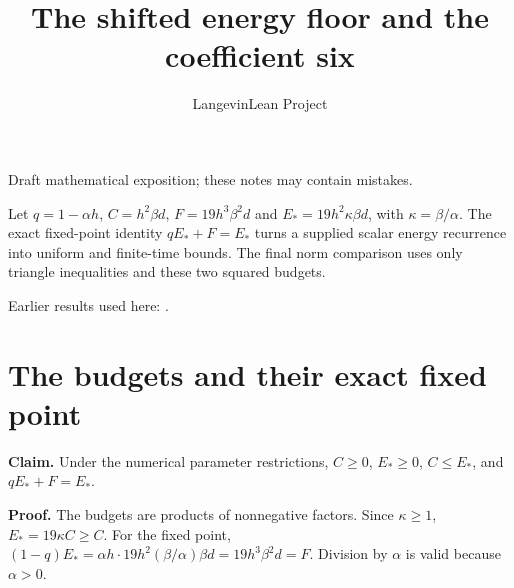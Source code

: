 \documentclass[11pt,a4paper]{article}
\title{\texorpdfstring{The shifted energy floor and the coefficient six}{The shifted energy floor and the coefficient six}}
\author{LangevinLean Project}
\date{}
\begin{document}
\maketitle
Draft mathematical exposition; these notes may contain mistakes.


Let \(q=1-\alpha h\), \(C=h^2\beta d\), \(F=19h^3\beta^2d\) and \(E_*=19h^2\kappa\beta d\), with \(\kappa=\beta/\alpha\). The exact fixed-point identity \(qE_*+F=E_*\) turns a supplied scalar energy recurrence into uniform and finite-time bounds. The final norm comparison uses only triangle inequalities and these two squared budgets.



Earlier results used here: \cite[Section~3.15]{LangevinLean2026ULASC}.

\section{\texorpdfstring{The budgets and their exact fixed point}{The budgets and their exact fixed point}}


\textbf{Claim.} Under the numerical parameter restrictions, \(C\ge0\), \(E_*\ge0\), \(C\le E_*\), and \(qE_*+F=E_*\).




\textbf{Proof.} The budgets are products of nonnegative factors. Since \(\kappa\ge1\), \(E_*=19\kappa C\ge C\). For the fixed point, \((1-q)E_*=\alpha h\cdot19h^2(\beta/\alpha)\beta d=19h^3\beta^2d=F\). Division by \(\alpha\) is valid because \(\alpha>0\).
\end{document}
